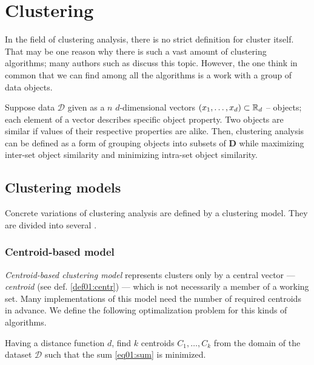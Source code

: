 \chapter{Clustering}

In the field of clustering analysis, there is no strict definition for cluster itself. That may be one reason why there is such a vast amount of clustering algorithms; many authors such as \citet{estivill2002so} discuss this topic.  However, the one think in common that we can find among all the algorithms is a work with a group of data objects.

Suppose data $\mathcal{D}$ given as a $n$ $d$-dimensional vectors $(x_1,\dots,x_d) \subset \mathbb{R}_d$  -- objects; each element of a vector describes specific object property. Two objects are similar if values of their respective properties are alike. Then, clustering analysis can be defined as a form of grouping objects into subsets of $\mathbf{D}$ while maximizing inter-set object similarity and minimizing intra-set object similarity.

\section{Clustering models}

Concrete variations of clustering analysis are defined by a clustering model. They are divided into several .

\subsection{Centroid-based model}

\emph{Centroid-based clustering model} represents clusters only by a central vector --- \emph{centroid} (see def. \ref{def01:centr}) --- which is not necessarily a member of a working set. Many implementations of this model need the number of required centroids in advance. We define the following optimalization problem for this kinds of algorithms. 

\begin{problem}
	Having a distance function $d$, find $k$ centroids $C_1,\dots,C_k$ from the domain of the dataset $\mathcal{D}$ such that the sum \ref{eq01:sum}
	is minimized.
\end{problem}

